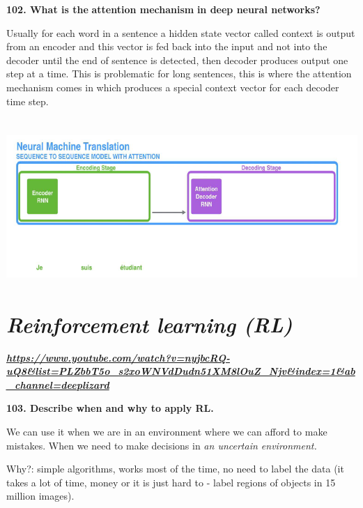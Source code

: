 \textbf{102. What is the} \textbf{attention mechanism} \textbf{in deep
neural networks?}

Usually for each word in a sentence a hidden state vector called context
is output from an encoder and this vector is fed back into the input and
not into the decoder until the end of sentence is detected, then decoder
produces output one step at a time. This is problematic for long
sentences, this is where the attention mechanism comes in which produces
a special context vector for each decoder time step.

\hypertarget{section}{%
\section{\texorpdfstring{\protect\includegraphics[width=\columnwidth]{media/image18.png}}{}}\label{section}}

\hypertarget{reinforcement-learning-rl}{%
\section{\texorpdfstring{\textit{Reinforcement learning
(RL)}}{Reinforcement learning (RL)}}\label{reinforcement-learning-rl}}

\href{https://www.youtube.com/watch?v=nyjbcRQ-uQ8\&list=PLZbbT5o_s2xoWNVdDudn51XM8lOuZ_Njv\&index=1\&ab_channel=deeplizard}{\textbf{\textit{https://www.youtube.com/watch?v=nyjbcRQ-uQ8\&list=PLZbbT5o\_s2xoWNVdDudn51XM8lOuZ\_Njv\&index=1\&ab\_channel=deeplizard}}}

\textbf{103. Describe when and why to apply RL.}

We can use it when we are in an environment where we can afford to make
mistakes. When we need to make decisions in \textit{an uncertain
environment.}

Why?: simple algorithms, works most of the time, no need to label the
data (it takes a lot of time, money or it is just hard to - label
regions of objects in 15 million images).

